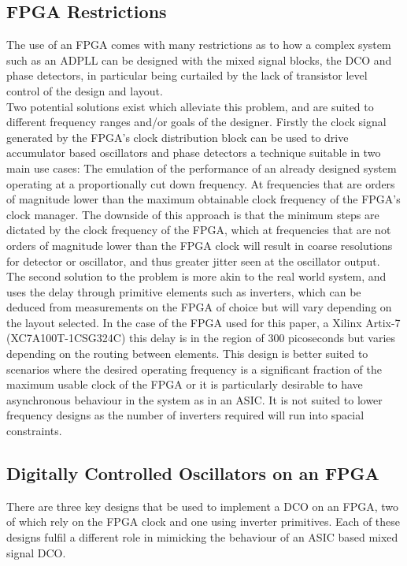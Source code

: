 \documentclass[conference]{IEEEtran}
\begin{document}
\subsection{FPGA Restrictions}
The use of an FPGA comes with many restrictions as to how a complex system such as an ADPLL can be designed with the mixed signal blocks, the DCO and phase detectors, in particular being curtailed by the lack of transistor level control of the design and layout.\\
Two potential solutions exist which alleviate this problem, and are suited to different frequency ranges and/or goals of the designer. Firstly the clock signal generated by the FPGA's clock distribution block can be used to drive accumulator based oscillators and phase detectors a technique suitable in two main use cases: The emulation of the performance of an already designed system operating at a proportionally cut down frequency. At frequencies that are orders of magnitude lower than the maximum obtainable clock frequency of the FPGA's clock manager.
The downside of this approach is that the minimum steps are dictated by the clock frequency of the FPGA, which at frequencies that are not orders of magnitude lower than the FPGA clock will result in coarse resolutions for detector or oscillator, and thus greater jitter seen at the oscillator output.\\
The second solution to the problem is more akin to the real world system, and uses the delay through primitive elements such as inverters, which can be deduced from measurements on the FPGA of choice but will vary depending on the layout selected. In the case of the FPGA used for this paper, a Xilinx Artix-7 (XC7A100T-1CSG324C) this delay is in the region of 300 picoseconds but varies depending on the routing between elements. This design is better suited to scenarios where the desired operating frequency is a significant fraction of the maximum usable clock of the FPGA or it is particularly desirable to have asynchronous behaviour in the system as in an ASIC. It is not suited to lower frequency designs as the number of inverters required will run into spacial constraints.
\subsection{Digitally Controlled Oscillators on an FPGA}
There are three key designs that be used to implement a DCO on an FPGA, two of which rely on the FPGA clock and one using inverter primitives. Each of these designs fulfil a different role in mimicking the behaviour of an ASIC based mixed signal DCO.
\end{document}
